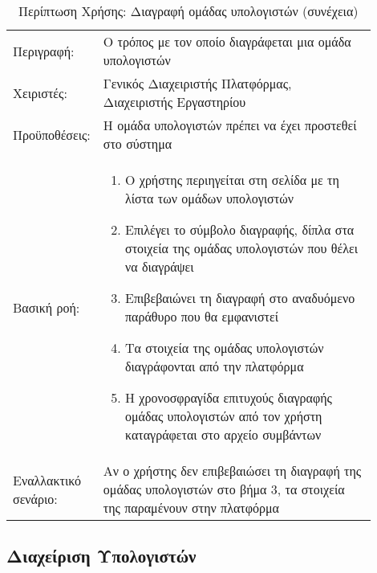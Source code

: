 %
%
\begin{longtable}{|p{0.14\linewidth}|p{0.76\linewidth}|}
	\caption{Περίπτωση Χρήσης: Διαγραφή ομάδας υπολογιστών} \label{tab:use-case-delete-group} \\ \hline \endfirsthead
	\caption[{}]{Περίπτωση Χρήσης: Διαγραφή ομάδας υπολογιστών (συνέχεια)} \\ \endhead \endfoot
	Περιγραφή: & Ο τρόπος με τον οποίο διαγράφεται μια ομάδα υπολογιστών \\ \hline
	Χειριστές: & Γενικός Διαχειριστής Πλατφόρμας, Διαχειριστής Εργαστηρίου \\ \hline
	Προϋποθέσεις: & Η ομάδα υπολογιστών πρέπει να έχει προστεθεί στο σύστημα \\ \hline
	Βασική ροή: &
	\begin{enumerate}
		\vspace{-1cm}
		\addtolength{\itemindent}{-0.4cm}
		\item Ο χρήστης περιηγείται στη σελίδα με τη λίστα των ομάδων υπολογιστών
		\item Επιλέγει το σύμβολο διαγραφής, δίπλα στα στοιχεία της ομάδας υπολογιστών που θέλει να διαγράψει
		\item Επιβεβαιώνει τη διαγραφή στο αναδυόμενο παράθυρο που θα εμφανιστεί
		\item Τα στοιχεία της ομάδας υπολογιστών διαγράφονται από την πλατφόρμα
		\item Η χρονοσφραγίδα επιτυχούς διαγραφής ομάδας υπολογιστών από τον χρήστη καταγράφεται στο αρχείο συμβάντων
		\vspace{-0.7cm}
	\end{enumerate} \\ \hline
	Εναλλακτικό σενάριο: & Αν ο χρήστης δεν επιβεβαιώσει τη διαγραφή της ομάδας υπολογιστών στο βήμα 3, τα στοιχεία της παραμένουν στην πλατφόρμα \\ \hline
\end{longtable}

\break
\subsection{Διαχείριση Υπολογιστών}

